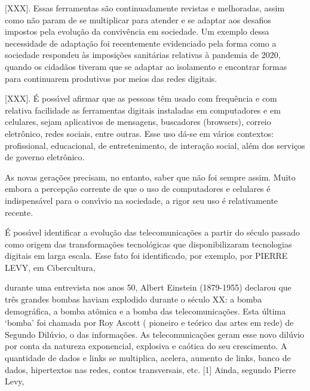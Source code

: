 \documentclass[
12pt,		%
openright,	%
twoside,  %
a4paper,			%
chapter=TITLE,		%
english,			%
french,				%
spanish,			%
brazil				%
]{USPSC-classe/USPSC}
\begin{document}
[XXX]. 
Essas ferramentas s\~ao continuadamente revistas e melhoradas, assim como n\~ao param de se multiplicar para atender e se adaptar aos desafios impostos pela evolu\c{c}\~ao da conviv\^encia em sociedade. Um exemplo dessa necessidade de adapta\c{c}\~ao foi recentemente evidenciado pela forma como a sociedade respondeu \`as imposi\c{c}\~oes sanit\'arias relativas \`a pandemia de 2020, quando os cidad\~aos tiveram que se adaptar ao isolamento e encontrar formas para continuarem produtivos por meios das redes digitais.




[XXX].
\'E poss\'{\i}vel afirmar que as pessoas t\^em usado com frequ\^encia e com relativa facilidade as ferramentas digitais instaladas em computadores e em celulares, sejam aplicativos de mensagens, buscadores (browsers), correio eletr\^onico, redes sociais, entre outras. Esse uso d\'a-se em v\'arios contextos: profissional, educacional, de entretenimento, de intera\c{c}\~ao social, al\'em dos servi\c{c}os de governo eletr\^onico.




As novas gera\c{c}\~oes precisam, no entanto, saber que n\~ao foi sempre assim. Muito embora a percep\c{c}\~ao corrente de que o uso de computadores e celulares \'e indispens\'avel para o conv\'{\i}vio na sociedade, a rigor seu uso \'e relativamente recente.




\'E poss\'{\i}vel identificar a evolu\c{c}\~ao das telecomunica\c{c}\~oes a partir do s\'eculo passado como origem das transforma\c{c}\~oes tecnol\'ogicas que disponibilizaram tecnologias digitais em larga escala. Esse fato foi identificado, por exemplo, por PIERRE LEVY, em Cibercultura, 




durante uma entrevista nos anos 50, Albert Einstein (1879-1955) declarou que tr\^es grandes bombas haviam  explodido durante o s\'eculo XX: a bomba demogr\'afica, a bomba at\^omica e a bomba das telecomunica\c{c}\~oes. Esta \'ultima ‘bomba’ foi chamada por Roy Ascott ( pioneiro e te\'orico das artes em rede) de Segundo Dil\'uvio, o das informa\c{c}\~oes. As telecomunica\c{c}\~oes geram esse novo dil\'uvio por conta da natureza exponencial, explosiva e ca\'otica do seu crescimento. A quantidade de dados e links se multiplica, acelera, aumento de links, banco de dados, hipertextos nas redes, contos transversais, etc.
[1]
Ainda, segundo Pierre Levy,
\end{document}
